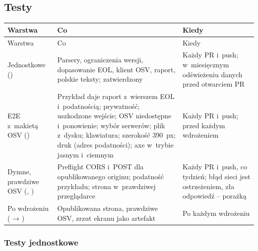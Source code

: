 \subsection{Testy}\label{sec:risk-scan-testy}

\begin{xltabular}{\linewidth}{@{}>{\raggedright\arraybackslash}p{3.3cm} >{\raggedright\arraybackslash}X >{\raggedright\arraybackslash}p{3.5cm}@{}}
\toprule
Warstwa & Co & Kiedy \\
\midrule
\endfirsthead
\toprule
Warstwa & Co & Kiedy \\
\midrule
\endhead
Jednostkowe () & Parsery, ograniczenia wersji, dopasowanie EOL, klient OSV, raport, polskie teksty; zatwierdzony  & Każdy PR i~push; w~miesięcznym odświeżeniu danych przed otwarciem PR \\
E2E z~makietą OSV () & Przykład daje raport z~wierszem EOL i~podatnością; prywatność; uszkodzone wejście; OSV niedostępne i~ponowienie; wybór serwerów; plik z~dysku; klawiatura; szerokość 390~px; druk (adres podatności); axe w~trybie jasnym i~ciemnym & Każdy PR i~push; przed każdym wdrożeniem \\
Dymne, prawdziwe OSV (, ) & Preflight CORS i~POST dla opublikowanego originu; podatność przykładu; strona w~prawdziwej przeglądarce & Każdy PR i~push, co tydzień; błąd sieci jest ostrzeżeniem, zła odpowiedź -- porażką \\
Po wdrożeniu ( → ) & Opublikowana strona, prawdziwe OSV, zrzut ekranu jako artefakt & Po każdym wdrożeniu \\
\bottomrule
\end{xltabular}

\subsubsection{Testy jednostkowe}

